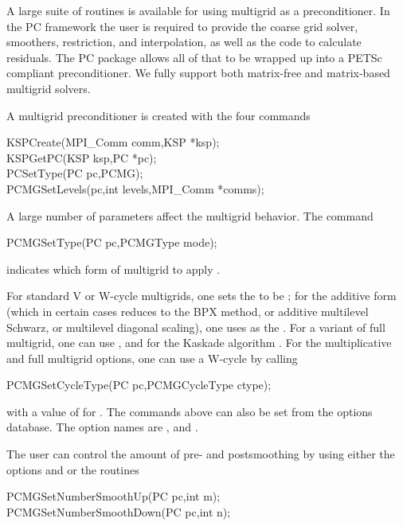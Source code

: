 A large suite of routines is available for using multigrid as a
preconditioner. In the PC framework the user is required to provide
the coarse grid solver, smoothers, restriction, and interpolation,
as well as the code to calculate residuals. The PC package
allows all of that to be wrapped up into a PETSc compliant preconditioner.
We fully support both matrix-free and matrix-based multigrid solvers.

A multigrid preconditioner is created with the four commands
\begin{tabbing}
  KSPCreate(MPI\_Comm comm,KSP *ksp);\\
  KSPGetPC(KSP ksp,PC *pc);\\
  PCSetType(PC pc,PCMG);\\
  PCMGSetLevels(pc,int levels,MPI\_Comm *comms);
\end{tabbing}
A
large number of parameters affect the multigrid behavior. The command
\begin{tabbing}
  PCMGSetType(PC pc,PCMGType mode);
\end{tabbing}
indicates which form of multigrid to apply \cite{1sbg}.
  

For standard V or W-cycle multigrids, one sets the  to be  ; for the
additive form (which in certain cases reduces to the BPX method, or additive
multilevel Schwarz, or multilevel diagonal scaling), one uses
  as the .  For a variant
of full multigrid, one can
 use  , and for the Kaskade
algorithm  .
For the multiplicative and full multigrid options, one can use a
W-cycle by   calling
\begin{tabbing}
  PCMGSetCycleType(PC pc,PCMGCycleType ctype);
\end{tabbing}
with a value of  for .
The commands above can also be set from the options database. The option
names are ,
and  .  

The user can control the amount of pre- and postsmoothing
  by using
either the options  
  and   or
the routines
\begin{tabbing}
  PCMGSetNumberSmoothUp(PC pc,int m);\\
  PCMGSetNumberSmoothDown(PC pc,int n);
\end{tabbing}

